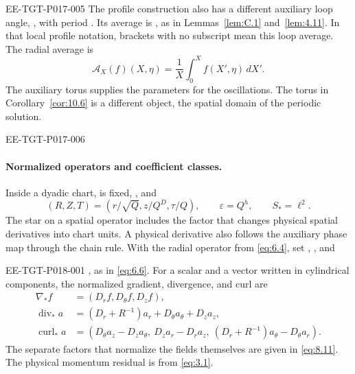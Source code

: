 \begin{EESegment}{EE-TGT-P017-005}
The profile construction also has a different auxiliary loop angle,
, with period . Its average is
,
as in Lemmas~\ref{lem:C.1} and~\ref{lem:4.11}. In that local profile notation, brackets with
no subscript mean this loop average. The radial average is
\begin{equation}
\mathcal A_X(f)(X,\eta)=\frac1X\int_0^X f(X',\eta)\,dX'.
\tag{3.10}\label{eq:3.10}
\end{equation}
The auxiliary torus supplies the parameters for the oscillations. The torus in
Corollary~\ref{cor:10.6} is a
different object, the spatial domain of the periodic solution.
\end{EESegment}

\begin{EESegment}{EE-TGT-P017-006}
\paragraph{Normalized operators and coefficient classes.}
Inside a dyadic chart,  is fixed,
, and
\[
(R,Z,T)=(r/\sqrt Q,z/Q^D,\tau/Q),
\qquad
\varepsilon=Q^h,
\qquad
S_*=\ell^2.
\]
The star on a spatial operator includes the factor  that changes
physical spatial derivatives into chart units. A physical derivative also follows the
auxiliary phase map through the chain rule. With the radial operator
 from \eqref{eq:6.4}, set
,
, and
\end{EESegment}

%
\begin{EESegment}{EE-TGT-P018-001}
, as in \eqref{eq:6.6}. For a scalar
 and a vector
 written in cylindrical components, the normalized
gradient, divergence, and curl are
\begin{equation}
\begin{aligned}
\nabla_*f&=(D_rf,D_\theta f,D_zf),\\
\operatorname{div}_*a&=(D_r+R^{-1})a_r+D_\theta a_\theta+D_za_z,\\
\operatorname{curl}_*a&=(D_\theta a_z-D_za_\theta,\ D_za_r-D_ra_z,\ (D_r+R^{-1})a_\theta-D_\theta a_r).
\end{aligned}
\tag{3.11}\label{eq:3.11}
\end{equation}
The separate factors that normalize the fields themselves are given in \eqref{eq:8.11}.
The physical momentum residual is  from \eqref{eq:3.1}.
\end{EESegment}

